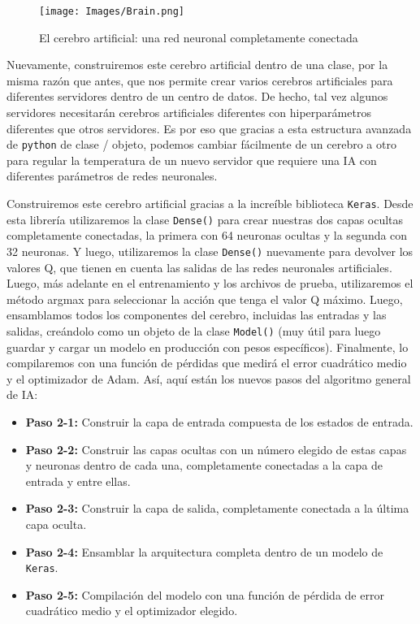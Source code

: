 \documentclass[]{book}
\providecommand{\tightlist}{%
  \setlength{\itemsep}{0pt}\setlength{\parskip}{0pt}}
\begin{document}
\begin{figure}
\centering
\texttt{[image: Images/Brain.png]}
\caption{El cerebro artificial: una red neuronal completamente conectada}
\end{figure}

Nuevamente, construiremos este cerebro artificial dentro de una clase, por la misma razón que antes, que nos permite crear varios cerebros artificiales para diferentes servidores dentro de un centro de datos. De hecho, tal vez algunos servidores necesitarán cerebros artificiales diferentes con hiperparámetros diferentes que otros servidores. Es por eso que gracias a esta estructura avanzada de \texttt{python} de clase / objeto, podemos cambiar fácilmente de un cerebro a otro para regular la temperatura de un nuevo servidor que requiere una IA con diferentes parámetros de redes neuronales.

Construiremos este cerebro artificial gracias a la increíble biblioteca \texttt{Keras}. Desde esta librería utilizaremos la clase \texttt{Dense()} para crear nuestras dos capas ocultas completamente conectadas, la primera con 64 neuronas ocultas y la segunda con 32 neuronas. Y luego, utilizaremos la clase \texttt{Dense()} nuevamente para devolver los valores Q, que tienen en cuenta las salidas de las redes neuronales artificiales. Luego, más adelante en el entrenamiento y los archivos de prueba, utilizaremos el método argmax para seleccionar la acción que tenga el valor Q máximo. Luego, ensamblamos todos los componentes del cerebro, incluidas las entradas y las salidas, creándolo como un objeto de la clase \texttt{Model()} (muy útil para luego guardar y cargar un modelo en producción con pesos específicos). Finalmente, lo compilaremos con una función de pérdidas que medirá el error cuadrático medio y el optimizador de Adam. Así, aquí están los nuevos pasos del algoritmo general de IA:

\begin{itemize}
\tightlist
\item
  \textbf{Paso 2-1:} Construir la capa de entrada compuesta de los estados de entrada.
\item
  \textbf{Paso 2-2:} Construir las capas ocultas con un número elegido de estas capas y neuronas dentro de cada una, completamente conectadas a la capa de entrada y entre ellas.
\item
  \textbf{Paso 2-3:} Construir la capa de salida, completamente conectada a la última capa oculta.
\item
  \textbf{Paso 2-4:} Ensamblar la arquitectura completa dentro de un modelo de \texttt{Keras}.
\item
  \textbf{Paso 2-5:} Compilación del modelo con una función de pérdida de error cuadrático medio y el optimizador elegido.
\end{itemize}
\end{document}
